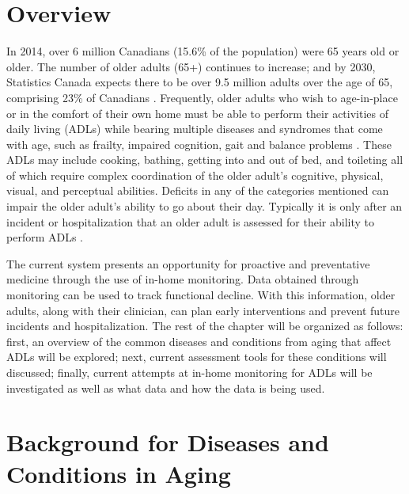 %


\section{Overview}
In 2014, over 6 million Canadians (15.6\% of the population) were 65 years old or older. The number of older adults (65+) continues to increase; and by 2030, Statistics Canada expects there to be over 9.5 million adults over the age of 65, comprising 23\% of Canadians \cite{government_of_canada_daily_2014}. Frequently, older adults who wish to age-in-place or in the comfort of their own home must be able to perform their activities of daily living (ADLs) while bearing multiple diseases and syndromes that come with age, such as frailty, impaired cognition, gait and balance problems \cite{tijsen_challenging_2019}. These ADLs may include cooking, bathing, getting into and out of bed, and toileting all of which require complex coordination of the older adult’s cognitive, physical, visual, and perceptual abilities. Deficits in any of the categories mentioned can impair the older adult’s ability to go about their day. Typically it is only after an incident or hospitalization that an older adult is assessed for their ability to perform ADLs \cite{wilkinson_comprehensive_2021}. 

The current system presents an opportunity for proactive and preventative medicine through the use of in-home monitoring. Data obtained through monitoring can be used to track functional decline. With this information, older adults, along with their clinician, can plan early interventions and prevent future incidents and hospitalization. The rest of the chapter will be organized as follows: first, an overview of the common diseases and conditions from aging that affect ADLs will be explored; next, current assessment tools for these conditions will discussed; finally, current attempts at in-home monitoring for ADLs will be investigated as well as what data and how the data is being used.

\section{Background for Diseases and Conditions in Aging}

